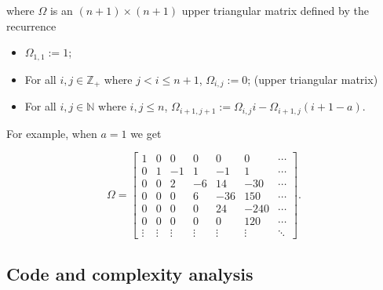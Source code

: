 \documentclass[12pt]{article}
\begin{document}
where $\Omega$ is an $(n+1) \times (n+1)$ upper triangular matrix defined by the recurrence


\begin{itemize}
    \item $\Omega_{1, 1} := 1$;
    \item For all $i, j \in \mathbb{Z_+}$ where  $j < i \leq n+1$, $\Omega_{i, j} := 0$; \hfill (upper triangular matrix)
    \item For all $i, j \in \mathbb{N}$ where $i, j \leq n$, $\Omega_{i+1, j+1} :=  \Omega_{i, j} i - \Omega_{i+1, j} (i+1-a)$.
\end{itemize}

For example, when $a = 1$ we get

$$
    \Omega =
    \begin{bmatrix}
        1      & 0      & 0      & 0      & 0      & 0      & \cdots \\
        0      & 1      & -1     & 1      & -1     & 1      & \cdots \\
        0      & 0      & 2      & -6     & 14     & -30    & \cdots \\
        0      & 0      & 0      & 6      & -36    & 150    & \cdots \\
        0      & 0      & 0      & 0      & 24     & -240   & \cdots \\
        0      & 0      & 0      & 0      & 0      & 120    & \cdots \\
        \vdots & \vdots & \vdots & \vdots & \vdots & \vdots & \ddots
    \end{bmatrix}.
$$

\vspace{20px}

\subsection{Code and complexity analysis}
\end{document}
